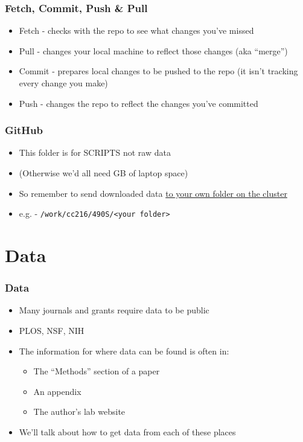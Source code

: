 \documentclass[14pt]{beamer}
\begin{document}
\begin{frame}
\frametitle{Fetch, Commit, Push \& Pull}
\begin{itemize}
	\item<+-> Fetch - checks with the repo to see what changes you've missed
	\item<+-> Pull - changes your local machine to reflect those changes (aka ``merge'')
	\item<+-> Commit - prepares local changes to be pushed to the repo (it isn't tracking every change you make)
	\item<+-> Push - changes the repo to reflect the changes you've committed
\end{itemize}
\end{frame}

\begin{frame}
\frametitle{GitHub}
\begin{itemize}
	\item<+-> This folder is for SCRIPTS not raw data
	\item<+-> (Otherwise we'd all need GB of laptop space)
	\item<+-> So remember to send downloaded data \underline{to your own folder on the cluster}
	\item<+-> e.g. - \texttt{/work/cc216/490S/<your folder>} 
\end{itemize}
\end{frame}

\section{Data}

\begin{frame}
\frametitle{Data}
\begin{itemize}
	\item<+-> Many journals and grants require data to be public
	\item<+-> PLOS, NSF, NIH
	\item<+-> The information for where data can be found is often in:
	\begin{itemize}
		\item<+-> The ``Methods'' section of a paper
		\item<+-> An appendix
		\item<+-> The author's lab website
	\end{itemize}
	\item<+-> We'll talk about how to get data from each of these places 
\end{itemize}
\end{frame}
\end{document}
